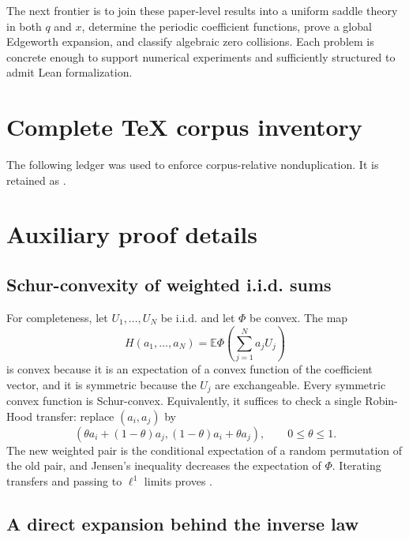 \documentclass[11pt]{article}
\numberwithin{equation}{section}
\theoremstyle{definition}
\theoremstyle{remark}
\newcommand{\E}{\mathbb E}
\begin{document}
The next frontier is to join these paper-level results into a uniform saddle theory in both
$q$ and $x$, determine the periodic coefficient functions, prove a global Edgeworth expansion,
and classify algebraic zero collisions.  Each problem is concrete enough to support numerical
experiments and sufficiently structured to admit Lean formalization.

\appendix
\renewcommand*{\theHsection}{\arabic{part}.\arabic{section}}

\section{Complete TeX corpus inventory}
\label{p10:app:inventory}

The following ledger was used to enforce corpus-relative nonduplication.  It is retained as
.



\section{Auxiliary proof details}
\label{p10:app:proofs}

\subsection{Schur-convexity of weighted i.i.d. sums}

For completeness, let $U_1,\ldots,U_N$ be i.i.d. and let $\Phi$ be convex.  The map
\[
 H(a_1,\ldots,a_N)=\E\Phi\!\left(\sum_{j=1}^Na_jU_j\right)
\]
is convex because it is an expectation of a convex function of the coefficient vector, and
it is symmetric because the $U_j$ are exchangeable.  Every symmetric convex function is
Schur-convex.  Equivalently, it suffices to check a single Robin-Hood transfer:
replace $(a_i,a_j)$ by
\[
 (\theta a_i+(1-\theta)a_j,
  (1-\theta)a_i+\theta a_j),
 \qquad 0\le\theta\le1.
\]
The new weighted pair is the conditional expectation of a random permutation of the old
pair, and Jensen's inequality decreases the expectation of $\Phi$.  Iterating transfers and
passing to $\ell^1$ limits proves .

\subsection{A direct expansion behind the inverse law}
\end{document}
